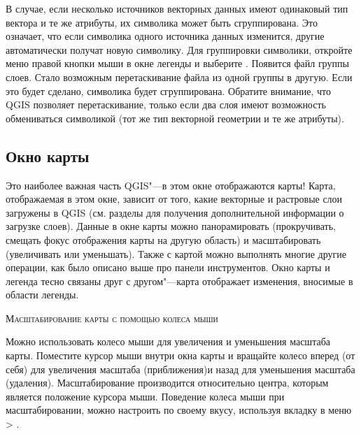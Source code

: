 В случае, если несколько источников векторных данных имеют одинаковый тип вектора и те же атрибуты,
их символика может быть сгруппирована. Это означает, что если символика одного источника данных
изменится, другие автоматически получат новую символику. Для группировки символики, откройте меню правой кнопки мыши в окне легенды и выберите . Появится файл группы слоев.
Стало возможным перетаскивание файла из одной группы в другую. Если это будет сделано, символика будет сгруппирована. Обратите внимание, что QGIS позволяет перетаскивание, только если два слоя имеют
возможность обмениваться символикой (тот же тип векторной геометрии и те же атрибуты).

%

\subsection{Окно карты}\label{label_mapview}

Это наиболее важная часть QGIS"---в этом окне отображаются карты! Карта, отображаемая в этом окне,
зависит от того, какие векторные и растровые слои загружены в QGIS (см. разделы для получения
дополнительной информации о загрузке слоев). Данные в окне карты можно панорамировать (прокручивать,
смещать фокус отображения карты на другую область) и масштабировать (увеличивать или уменьшать). Также с картой можно выполнять многие другие операции, как было описано выше про панели инструментов. Окно карты и легенда тесно связаны друг с другом"---карта отображает изменения, вносимые в области легенды.

\begin{Tip}\caption{\textsc{Масштабирование карты с помощью колеса мыши}}
Можно использовать колесо мыши для увеличения и уменьшения масштаба карты. Поместите курсор мыши
внутри окна карты и вращайте колесо вперед (от себя) для увеличения масштаба (приближения)и назад
для уменьшения масштаба (удаления). Масштабирование производится относительно центра, которым
является положение курсора мыши. Поведение колеса мыши при масштабировании, можно настроить по
своему вкусу, используя вкладку  в меню  >
.
\end{Tip}

